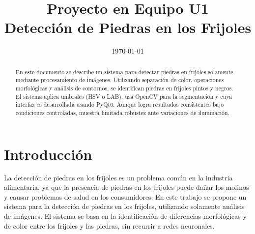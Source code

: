 \documentclass[conference]{IEEEtran}
\date{\specialdate\today}
\begin{document}
\newcommand{\breite}{0.9} %
\newcommand{\RelacionFiguradoscolumnas}{0.9}
\newcommand{\RelacionFiguradoscolumnasPuntoCinco}{0.45}

\title{Proyecto en Equipo U1 \\ Detección de Piedras en los Frijoles}

\author{
}

\maketitle

\begin{abstract} 
    En este documento se describe un sistema para detectar piedras en frijoles solamente mediante procesamiento de imágenes. Utilizando separación de color, operaciones morfológicas y análisis de contornos, se identifican piedras en frijoles pintos y negros. El sistema aplica umbrales (HSV o LAB), usa OpenCV para la segmentación y cuya interfaz es desarrollada usando PyQt6. Aunque logra resultados consistentes bajo condiciones controladas, muestra limitada robustez ante variaciones de iluminación.
\end{abstract}

\section{Introducción}
    La detección de piedras en los frijoles es un problema común en la industria alimentaria, ya que la presencia de piedras en los frijoles puede dañar los molinos y causar problemas de salud en los consumidores. En este trabajo se propone un sistema para la detección de piedras en los frijoles, utilizando solamente análisis de imágenes. El sistema se basa en la identificación de diferencias morfológicas y de color entre los frijoles y las piedras, sin recurrir a redes neuronales. 
    
\end{document}
